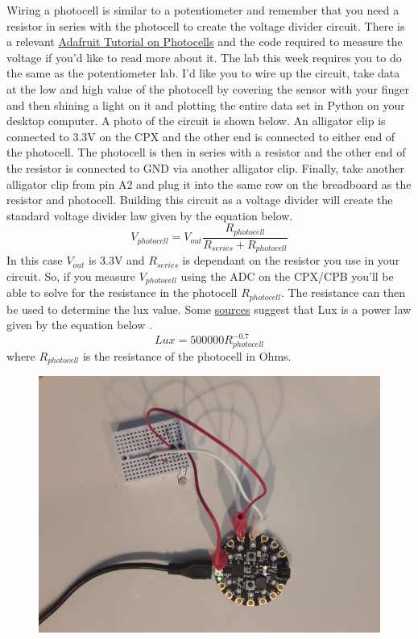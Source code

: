 Wiring a photocell is similar to a potentiometer and remember that you need a resistor in series with the photocell to create the voltage divider circuit. There is a relevant \href{https://learn.adafruit.com/photocells/circuitpython}{Adafruit Tutorial on Photocells} and the code required to measure the voltage if you’d like to read more about it. The lab this week requires you to do the same as the potentiometer lab. I’d like you to wire up the circuit, take data at the low and high value of the photocell by covering the sensor with your finger and then shining a light on it and plotting the entire data set in Python on your desktop computer. A photo of the circuit is shown below. An alligator clip is connected to 3.3V on the CPX and the other end is connected to either end of the photocell. The photocell is then in series with a resistor and the other end of the resistor is connected to GND via another alligator clip. Finally, take another alligator clip from pin A2 and plug it into the same row on the breadboard as the resistor and photocell. Building this circuit as a voltage divider will create the standard voltage divider law given by the equation below.
\begin{equation}
V_{photocell} = V_{out}\frac{R_{photocell}}{R_{series}+R_{photocell}}
\end{equation}
In this case $V_{out}$ is 3.3V and $R_{series}$ is dependant on the resistor you use in your circuit. So, if you measure $V_{photocell}$ using the ADC on the CPX/CPB you'll be able to solve for the resistance in the photocell $R_{photocell}$. The resistance can then be used to determine the lux value. Some \href{https://www.researchgate.net/publication/375038565_Measuring_the_Voltage_Current_and_Resistance_of_the_LDR_Sensor_through_the_Arduino_UNO}{sources} suggest that Lux is a power law given by the equation below \cite{photocell2023}.
\begin{equation}
Lux = 500000R_{photocell}^{-0.7}
\end{equation}
where $R_{photocell}$ is the resistance of the photocell in Ohms.
\begin{figure}[H]
  \begin{center}
    \includegraphics[width=\textwidth]{Figures/photocell_circuit.jpeg}
  \end{center}
\end{figure}
